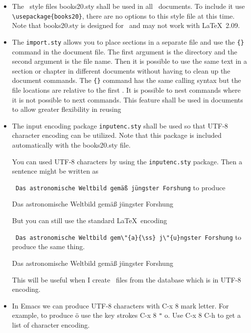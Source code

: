\documentclass{article}
\begin{document}
\begin{itemize}
  
\item The \LaTeXe\ style files books20.sty shall be used in all
  \LaTeXe\ documents. To include it use \verb|\usepackage{books20}|, there
  are no options to this style file at this time. Note that books20.sty
  is designed for \LaTeXe\ and may not work with \LaTeX\ 2.09.
  

\item The \texttt{import.sty} allows you to place sections in a
  separate file and use the \verb|{}| command in the document
  file. The first argument is the directory and the second argument is
  the file name. Then it is possible to use the same text in a section
  or chapter in different documents without having to clean up the
  document commands. The \verb|{}| command has the same
  calling syntax but the file locations are relative to the first
  \verb||. It is possible to nest \verb|| commands where
  it is not possible to next \verb|| commands. This feature shall be
  used in documents to allow greater flexibility in reusing 

\item {The input encoding package \texttt{inputenc.sty} shall be used
  so that UTF-8 character encoding can be utilized. Note that this
  package is included automatically with the books20.sty file.

  You can used UTF-8 characters by using the \texttt{inputenc.sty}
  package.  Then a sentence might be written as
  
  \verb| Das astronomische Weltbild gemäß jüngster Forshung|
  to produce

  Das astronomische Weltbild gemäß jüngster Forshung

  But you can still use the standard \LaTeX\ encoding
  
  \verb| Das astronomische Weltbild gem\"{a}{\ss} j\"{u}ngster Forshung|
  to produce the same thing.

  Das astronomische Weltbild gem\"{a}{\ss} j\"{u}ngster Forshung

  This will be useful when I create \LaTeXe\ files from the database
  which is in UTF-8 encoding.
}

\item In Emacs we can produce UTF-8 characters with C-x 8 mark letter.
  For example, to produce ö use the key strokes C-x 8 \verb|"| o. Use C-x 8 C-h
  to get a list of character encoding.
  

\end{itemize}
\end{document}
